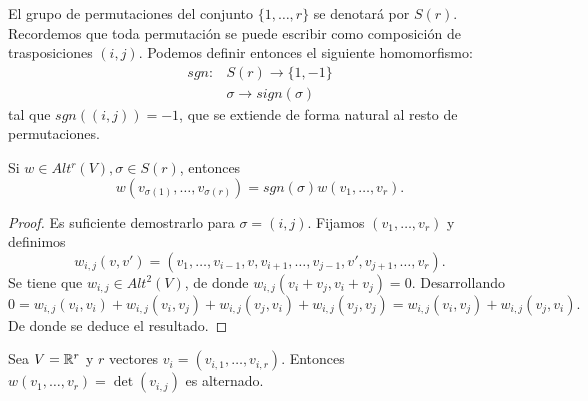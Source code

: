 \documentclass[cursovd_portada.tex]{subfiles}
\begin{document}
El grupo de permutaciones del conjunto $\{1,\dots, r\}$ se denotará por $S(r)$. Recordemos que toda permutación se puede escribir como composición de trasposiciones $(i,j)$. Podemos definir entonces el siguiente homomorfismo:
\begin{align*}
sgn: & S(r)\to \{1,-1\}\\
& \sigma\to sign(\sigma)
\end{align*}
tal que $sgn((i,j))=-1$, que se extiende de forma natural al resto de permutaciones.
\begin{lemma}
Si $w\in Alt^r(V), \sigma\in S(r)$, entonces
$$w(v_{\sigma(1)},\dots, v_{\sigma(r)})=sgn(\sigma)w(v_1,\dots, v_r).$$
\end{lemma}
\begin{proof}
Es suficiente demostrarlo para $\sigma=(i,j)$. Fijamos $(v_1,\dots, v_r)$ y definimos 
$$w_{i,j}(v,v')=(v_1,\dots,v_{i-1},v,v_{i+1},\dots, v_{j-1},v',v_{j+1},\dots, v_r).$$ 
Se tiene que $w_{i,j}\in Alt^2(V)$, de donde $w_{i,j}(v_i+v_j,v_i+v_j)=0$. Desarrollando
$$
0=w_{i,j}(v_i,v_i)+w_{i,j}(v_i,v_j)+w_{i,j}(v_j,v_i)+w_{i,j}(v_j,v_j)=w_{i,j}(v_i,v_j)+w_{i,j}(v_j,v_i).$$
De donde se deduce el resultado.
\end{proof}
\begin{ej}
Sea $V=\mathbb{R}^r$ y $r$ vectores $v_i=(v_{i,1},\dots, v_{i,r})$. Entonces $w(v_1,\dots, v_r)=\det(v_{i,j})$ es alternado. 
\end{ej}
\end{document}
